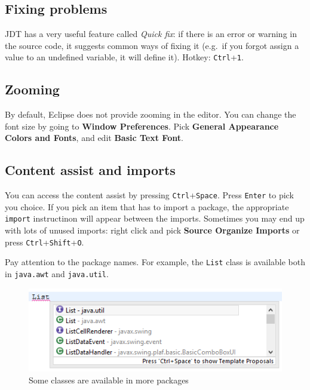 \documentclass[]{report}
\let\Oldincludegraphics\includegraphics
\renewcommand{\includegraphics}[1]{
\begin{adjustbox}{max size={\textwidth}{\textheight}}
    \Oldincludegraphics[scale=0.6]{#1}%
\end{adjustbox}
}
\begin{document}
\subsection{Fixing problems}

JDT has a very useful feature called \emph{Quick fix}: if there is an
error or warning in the source code, it suggests common ways of fixing
it (e.g.~if you forgot assign a value to an undefined variable, it will
define it). Hotkey: \texttt{Ctrl}+\texttt{1}.

\subsection{Zooming}

By default, Eclipse does not provide zooming in the editor. You can
change the font size by going to \textbf{Window \textbar{} Preferences}.
Pick \textbf{General \textbar{} Appearance \textbar{} Colors and Fonts},
and edit \textbf{Basic \textbar{} Text Font}.

\subsection{Content assist and imports}

You can access the content assist by pressing
\texttt{Ctrl}+\texttt{Space}. Press \texttt{Enter} to pick you choice.
If you pick an item that has to import a package, the appropriate
\texttt{import} instructinon will appear between the imports. Sometimes
you may end up with lots of unused imports: right click and pick
\textbf{Source \textbar{} Organize Imports} or press
\texttt{Ctrl}+\texttt{Shift}+\texttt{O}.

Pay attention to the package names. For example, the \texttt{List} class
is available both in \texttt{java.awt} and \texttt{java.util}.

\begin{figure}[htbp]
\centering
\includegraphics{img/eclipse_basics/content_assist.png}
\caption{Some classes are available in more packages}
\end{figure}
\end{document}
